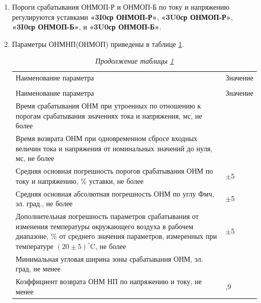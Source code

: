 \begin{enumerate}
\begin{enumerate}
\item
Пороги срабатывания ОНМОП-Р и ОНМОП-Б по току и напряжению регулируются уставками \textbf{«3I0ср ОНМОП-Р»}, \textbf{«3U0ср ОНМОП-Р»}, \textbf{«3I0ср ОНМОП-Б»}, и \textbf{«3U0ср ОНМОП-Б»}.

\item
Параметры ОНМНП(ОНМОП) приведены в таблице \ref{desc_tznp:tbl2}.

\small
\setlength{\extrarowheight}{0.05cm} %
\begin{longtable}
{|>{\centering\arraybackslash}m{15.2cm}|>{\centering\arraybackslash}m{1.7cm}|}
\caption{Параметры ОНМНП(ОНМОП)\hfill\vspace{-0.5\baselineskip}}\label{desc_tznp:tbl2}\\ 
\hhline{|-|-|}
\rowcolor{gray!30}
Наименование параметра & Значение  \\ 
\hhline{|-|-|}
\endfirsthead

\caption*{\hspace{3pt}\emph{Продолжение таблицы \ref{desc_tznp:tbl2}\hfill\vspace{-0.5\baselineskip}}} \\ %
\hhline{|-|-|}
\rowcolor{gray!30}
Наименование параметра & Значение  \\ 
\hhline{|-|-|}
\endhead
\hhline{|-|-|}

\endfoot
\endlastfoot

\raggedright Время срабатывания ОНМ при утроенных по отношению к порогам срабатывания значениях тока и напряжения, мс, не более & \centering\arraybackslash 35  \\  \hline
\raggedright Время возврата ОНМ при одновременном сбросе входных величин тока и напряжения от номинальных значений до нуля, мс, не более  & \centering\arraybackslash 25  \\  \hline
\raggedright Средняя основная погрешность порогов срабатывания ОНМ по току и напряжению, \% уставки, не более   & \centering\arraybackslash $\pm$5  \\  \hline
\raggedright Средняя основная абсолютная погрешность ОНМ по углу Фмч, эл. град., не более & \centering\arraybackslash $\pm$5 \\  \hline
\raggedright Дополнительная погрешность параметров срабатывания от изменения температуры окружающего воздуха в рабочем диапазоне, \% от среднего значения параметров, измеренных при температуре $(20\pm5)^\circ$C, не более & \centering\arraybackslash $\pm$5 \\  \hline
\raggedright Минимальная угловая ширина зоны срабатывания ОНМ, эл. град, не менее & \centering\arraybackslash 165 \\ \hline
\raggedright Коэффициент возврата ОНМ НП по напряжению и току, не менее  & \centering\arraybackslash 0,9\\  \hline


\end{longtable}
\end{enumerate}
\end{enumerate}
